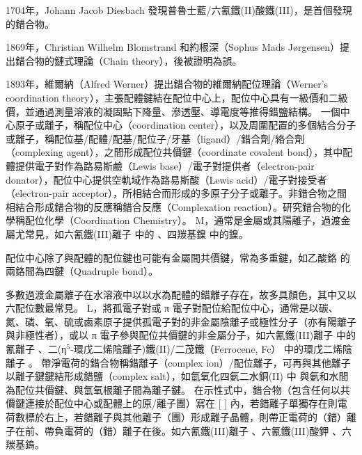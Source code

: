 \documentclass[a4paper,12pt]{report}
\begin{document}
\bit
\item 1704年，Johann Jacob Diesbach 發現普魯士藍/六氰鐵(II)酸鐵(III)，是首個發現的錯合物。
\item 1869年，Christian Wilhelm Blomstrand 和約根深（Sophus Mads Jørgensen）提出錯合物的鏈式理論（Chain theory），後被證明為誤。
\item 1893年，維爾納（Alfred Werner）提出錯合物的維爾納配位理論（Werner's coordination theory），主張配體鍵結在配位中心上，配位中心具有一級價和二級價，並通過測量溶液的凝固點下降量、滲透壓、導電度等推得錯鹽結構。
\eit
{}
一個中心原子或離子，稱配位中心（coordination center），以及周圍配置的多個結合分子或離子，稱配位基/配體/配基/配位子/牙基（ligand）/錯合劑/絡合劑（complexing agent），之間形成配位共價鍵（coordinate covalent bond），其中配體提供電子對作為路易斯鹼（Lewis base）/電子對提供者（electron-pair donator），配位中心提供空軌域作為路易斯酸（Lewis acid）/電子對接受者（electron-pair acceptor），所相結合而形成的多原子分子或離子。非錯合物之間相結合形成錯合物的反應稱錯合反應（Complexation reaction）。研究錯合物的化學稱配位化學（Coordination Chemistry）。
M，通常是金屬或其陽離子，過渡金屬尤常見，如六氰鐵(III)離子  中的 、四羰基鎳 \ce{[Ni(CO)4]} 中的鎳。

配位中心除了與配體的配位鍵也可能有金屬間共價鍵，常為多重鍵，如乙酸鉻 \ce{[Cr2(CH3COO)4(H2O)2]} 的兩鉻間為四鍵（Quadruple bond）。

多數過渡金屬離子在水溶液中以以水為配體的錯離子存在，故多具顏色，其中又以六配位數最常見。
L，將孤電子對或 π 電子對配位給配位中心，通常是以碳、氮、磷、氧、硫或鹵素原子提供孤電子對的非金屬陰離子或極性分子（亦有陽離子與非極性者），或以 π 電子參與配位共價鍵的非金屬分子，如六氰鐵(III)離子  中的氰離子 、二(η$^5$-環戊二烯陰離子)鐵(II)/二茂鐵（Ferrocene, Fc）  中的環戊二烯陰離子 。
帶淨電荷的錯合物稱錯離子（complex ion）/配位離子，可再與其他離子以離子鍵鍵結形成錯鹽（complex salt），如氫氧化四氨二水銅(II)  中  與氨和水間為配位共價鍵、與氫氧根離子間為離子鍵。
在示性式中，錯合物（包含任何以共價鍵連接於配位中心或配體上的原/離子團）寫在 [ ] 內，若錯離子單獨存在則電荷數標於右上，若錯離子與其他離子（團）形成離子晶體，則帶正電荷的（錯）離子在前、帶負電荷的（錯）離子在後。如六氰鐵(III)離子 、六氰鐵(III)酸鉀 、六羰基鎢\ce{[W(CO)6]}。
\end{document}

